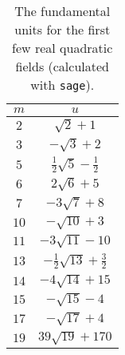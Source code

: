 \begin{table}
    \begin{tabular}{c | c}
        $m$  & $u$                                    \\
        \hline
        $2$  & $\sqrt{2} + 1$                         \\
        $3$  & $-\sqrt{3} + 2$                        \\
        $5$  & $\frac{1}{2} \sqrt{5} - \frac{1}{2}$   \\
        $6$  & $2 \sqrt{6} + 5$                       \\
        $7$  & $-3 \sqrt{7} + 8$                      \\
        $10$ & $-\sqrt{10} + 3$                       \\
        $11$ & $-3 \sqrt{11} - 10$                    \\
        $13$ & $-\frac{1}{2} \sqrt{13} + \frac{3}{2}$ \\
        $14$ & $-4 \sqrt{14} + 15$                    \\
        $15$ & $-\sqrt{15} - 4$                       \\
        $17$ & $-\sqrt{17} + 4$                       \\
        $19$ & $39 \sqrt{19} + 170$
    \end{tabular}
    \caption{The fundamental units for the first few real quadratic fields (calculated with \texttt{sage}).}
    \label{tab:fundamental-units}
\end{table}

